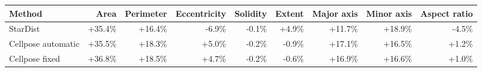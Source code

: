 \begin{tabular}{lrrrrrrrr}
\toprule
Method & Area & Perimeter & Eccentricity & Solidity & Extent & Major axis & Minor axis & Aspect ratio \\
\midrule
StarDist & +35.4\% & +16.4\% & -6.9\% & -0.1\% & +4.9\% & +11.7\% & +18.9\% & -4.5\% \\
Cellpose automatic & +35.5\% & +18.3\% & +5.0\% & -0.2\% & -0.9\% & +17.1\% & +16.5\% & +1.2\% \\
Cellpose fixed & +36.8\% & +18.5\% & +4.7\% & -0.2\% & -0.6\% & +16.9\% & +16.6\% & +1.0\% \\
\bottomrule
\end{tabular}
